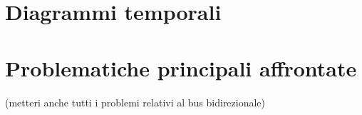 

\section{Diagrammi temporali}

\section{Problematiche principali affrontate}

(metteri anche tutti i problemi relativi al bus bidirezionale)\\


